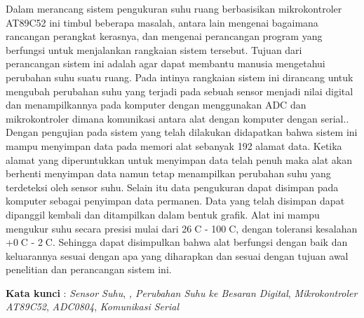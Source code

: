 \documentclass{jtetiproposalskripsi}
\begin{document}
\cover

\approvalpage


\begin{abstractind}
Dalam merancang sistem pengukuran suhu ruang berbasisikan mikrokontroler AT89C52 ini timbul beberapa masalah, antara lain mengenai bagaimana rancangan perangkat kerasnya, dan mengenai perancangan program yang berfungsi untuk menjalankan rangkaian sistem tersebut. Tujuan dari perancangan sistem ini adalah agar dapat membantu manusia mengetahui perubahan suhu suatu ruang. Pada intinya rangkaian sistem ini dirancang untuk mengubah perubahan suhu yang terjadi pada sebuah sensor menjadi nilai digital dan menampilkannya pada komputer dengan menggunakan ADC dan mikrokontroler dimana komunikasi antara alat dengan komputer dengan serial.. Dengan pengujian pada sistem yang telah dilakukan didapatkan bahwa sistem ini mampu menyimpan data pada memori alat sebanyak 192 alamat data. Ketika alamat yang diperuntukkan untuk menyimpan data telah penuh maka alat akan berhenti menyimpan data namun tetap menampilkan perubahan suhu yang terdeteksi oleh sensor suhu. Selain itu data pengukuran dapat disimpan pada komputer sebagai penyimpan data permanen. Data yang telah disimpan dapat dipanggil kembali dan ditampilkan dalam bentuk grafik. Alat ini mampu mengukur suhu secara presisi mulai dari 26C - 100C, dengan toleransi kesalahan +0C - 2C. Sehingga dapat disimpulkan bahwa alat berfungsi dengan baik dan keluarannya sesuai dengan apa yang diharapkan dan sesuai dengan tujuan awal penelitian dan perancangan sistem ini.





\bigskip
\textbf{Kata kunci} : \emph{Sensor Suhu}, \emph{, Perubahan Suhu ke Besaran Digital}, \emph{Mikrokontroler AT89C52}, \emph{ADC0804}, \emph{Komunikasi Serial}
\end{abstractind}

\tableofcontents
{}
\clearpage{}\setcounter{page}{1}
\end{document}
